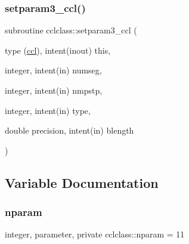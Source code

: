 \mbox{\label{namespacecclclass_a5a90756fe0684d2f29121a368dbef489}} 
\subsubsection{\texorpdfstring{setparam3\_ccl()}{setparam3\_ccl()}}
{\footnotesize\ttfamily subroutine cclclass\+::setparam3\+\_\+ccl (\begin{DoxyParamCaption}\item[{type (\mbox{\hyperlink{namespacecclclass_structcclclass_1_1ccl}{ccl}}), intent(inout)}]{this,  }\item[{integer, intent(in)}]{numseg,  }\item[{integer, intent(in)}]{nmpstp,  }\item[{integer, intent(in)}]{type,  }\item[{double precision, intent(in)}]{blength }\end{DoxyParamCaption})}



\subsection{Variable Documentation}
\mbox{\label{namespacecclclass_adeb399ff41e54cda7bdefa51063c0de6}} 
\subsubsection{\texorpdfstring{nparam}{nparam}}
{\footnotesize\ttfamily integer, parameter, private cclclass\+::nparam = 11\hspace{0.3cm}{\ttfamily [private]}}

